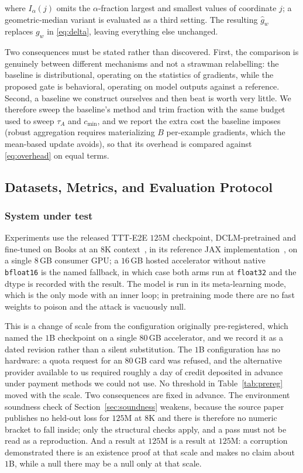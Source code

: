 \documentclass[journal]{IEEEtran}
\begin{document}
where $I_{\alpha}(j)$ omits the $\alpha$-fraction largest and smallest values of
coordinate $j$; a geometric-median variant is evaluated as a third setting. The
resulting $\hat{g}_w$ replaces $g_w$ in \eqref{eq:delta}, leaving everything else
unchanged.

Two consequences must be stated rather than discovered. First, the comparison is
genuinely between different mechanisms and not a strawman relabelling: the baseline
is distributional, operating on the statistics of gradients, while the proposed gate
is behavioral, operating on model outputs against a reference. Second, a baseline we
construct ourselves and then beat is worth very little. We therefore sweep the
baseline's method and trim fraction with the same budget used to sweep $\tau_A$ and
$c_{\min}$, and we report the extra cost the baseline imposes (robust aggregation
requires materializing $B$ per-example gradients, which the mean-based update avoids), so that its overhead is compared against \eqref{eq:overhead} on equal terms.

\subsection{Datasets, Metrics, and Evaluation Protocol}
\label{sec:protocol}

\subsubsection{System under test}
\label{sec:sut}
Experiments use the released TTT-E2E $125$M checkpoint, DCLM-pretrained and
fine-tuned on Books at an $8$K context~\cite{tandon2025tttE2E}, in its reference JAX
implementation~\cite{bradbury2018jax,kidger2021equinox}, on a single $8$\,GB
consumer GPU; a $16$\,GB hosted accelerator without native \texttt{bfloat16} is the
named fallback, in which case both arms run at \texttt{float32} and the dtype is
recorded with the result. The model is run in its meta-learning mode, which is the
only mode with an inner loop; in pretraining mode there are no fast weights to
poison and the attack is vacuously null.

This is a change of scale from the configuration originally pre-registered, which
named the $1$B checkpoint on a single $80$\,GB accelerator, and we record it as a
dated revision rather than a silent substitution. The $1$B configuration has no
hardware: a quota request for an $80$\,GB card was refused, and the alternative
provider available to us required roughly a day of credit deposited in advance
under payment methods we could not use. No threshold in Table~\ref{tab:prereg}
moved with the scale. Two consequences are fixed in advance. The environment
soundness check of Section~\ref{sec:soundness} weakens, because the source paper
publishes no held-out loss for $125$M at $8$K and there is therefore no numeric
bracket to fall inside; only the structural checks apply, and a pass must not be
read as a reproduction. And a result at $125$M is a result at $125$M: a corruption
demonstrated there is an existence proof at that scale and makes no claim about
$1$B, while a null there may be a null only at that scale.
\end{document}
